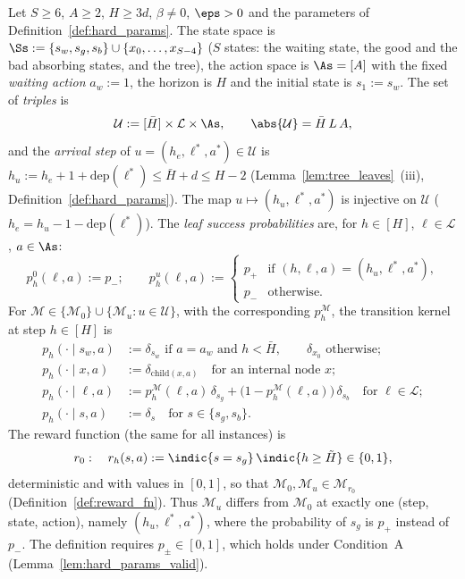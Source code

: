 \begin{definition}\label{def:hard_mdp}
\leanok
Let $S \ge 6$, $A \ge 2$, $H \ge 3d$, $\beta \ne 0$, $\eps > 0$ and the parameters of
Definition~\ref{def:hard_params}. The state space is
$\Ss := \{s_w, s_g, s_b\} \cup \{x_0, \dots, x_{S-4}\}$ ($S$ states: the waiting state, the good
and the bad absorbing states, and the tree), the action space is $\As = [A]$ with the fixed
\emph{waiting action} $a_w := 1$, the horizon is $H$ and the initial state is $s_1 := s_w$. The set
of \emph{triples} is
\[
  \mathcal U := [\bar H] \times \mathcal L \times \As, \qquad \abs{\mathcal U} = \bar H\, L\, A,
\]
and the \emph{arrival step} of $u = (h_e, \ell^*, a^*) \in \mathcal U$ is
$h_u := h_e + 1 + \mathrm{dep}(\ell^*) \le \bar H + d \le H - 2$ (Lemma~\ref{lem:tree_leaves}~(iii),
Definition~\ref{def:hard_params}). The map $u \mapsto (h_u, \ell^*, a^*)$ is injective on
$\mathcal U$ ($h_e = h_u - 1 - \mathrm{dep}(\ell^*)$). The \emph{leaf success probabilities} are,
for $h \in [H]$, $\ell \in \mathcal L$, $a \in \As$:
\[
  p^{0}_h(\ell, a) := p_- ; \qquad
  p^{u}_h(\ell, a) := \begin{cases} p_+ & \text{if } (h, \ell, a) = (h_u, \ell^*, a^*), \\ p_- & \text{otherwise.}\end{cases}
\]
For $\mathcal M \in \{\mathcal M_0\} \cup \{\mathcal M_u : u \in \mathcal U\}$, with the
corresponding $p^{\mathcal M}_h$, the transition kernel at step $h \in [H]$ is
\begin{align*}
  p_h(\cdot \mid s_w, a) &:= \delta_{s_w} \text{ if } a = a_w \text{ and } h < \bar H, \qquad \delta_{x_0} \text{ otherwise}; \\
  p_h(\cdot \mid x, a) &:= \delta_{\mathrm{child}(x, a)} \quad \text{for an internal node } x; \\
  p_h(\cdot \mid \ell, a) &:= p^{\mathcal M}_h(\ell,a)\,\delta_{s_g} + \big(1 - p^{\mathcal M}_h(\ell,a)\big)\,\delta_{s_b} \quad \text{for } \ell \in \mathcal L; \\
  p_h(\cdot \mid s, a) &:= \delta_s \quad \text{for } s \in \{s_g, s_b\} .
\end{align*}
The reward function (the same for all instances) is
\[
  r_0 : \quad r_h(s, a) := \indic\{s = s_g\}\,\indic\{h \ge \tilde H\} \in \{0, 1\},
\]
deterministic and with values in $[0,1]$, so that $\mathcal M_0, \mathcal M_u \in \mathcal M_{r_0}$
(Definition~\ref{def:reward_fn}). Thus $\mathcal M_u$ differs from $\mathcal M_0$ at exactly one
(step, state, action), namely $(h_u, \ell^*, a^*)$, where the probability of $s_g$ is $p_+$
instead of $p_-$. The definition requires $p_\pm \in [0,1]$, which holds under Condition~A
(Lemma~\ref{lem:hard_params_valid}).
\end{definition}

